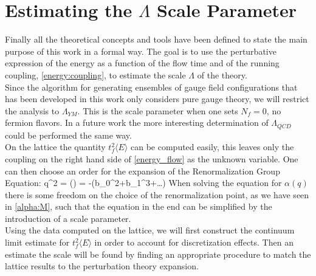 \section{Estimating the $\Lambda$ Scale Parameter}
Finally all the theoretical concepts and tools have been defined to state the main purpose of this work in a formal way. The goal is to use the perturbative expression of the energy as a function of the flow time and of the running coupling, \cref{energy:coupling}, to estimate the scale $\Lambda$ of the theory. \\
Since the algorithm for generating ensembles of gauge field configurations that has been developed in this work only considers pure gauge theory, we will restrict the analysis to $\Lambda_{YM}$. This is the scale parameter when one sets $N_f = 0$, no fermion flavors. In a future work the more interesting determination of $\Lambda_{QCD}$ could be performed the same way. \\
On the lattice the quantity $t_f^2\langle E \rangle$ can be computed easily, this leaves only the coupling on the right hand side of \cref{energy_flow} as the unknown variable. One can then choose an order for the expansion of the Renormalization Group Equation:
\beq
q^2  = \beta(\alpha) = -(b_0\alpha^2+b_1\alpha^3+\dots)
\eeq
When solving the equation for $\alpha(q)$ there is some freedom on the choice of the renormalization point, as we have seen in \cref{alpha:M}, such that the equation in the end can be simplified by the introduction of a scale parameter.\\
Using the data computed on the lattice, we will first construct the continuum limit estimate for $t_f^2\langle E \rangle$ in order to account for discretization effects. Then an estimate the scale will be found by finding an appropriate procedure to match the lattice results to the perturbation theory expansion. 

